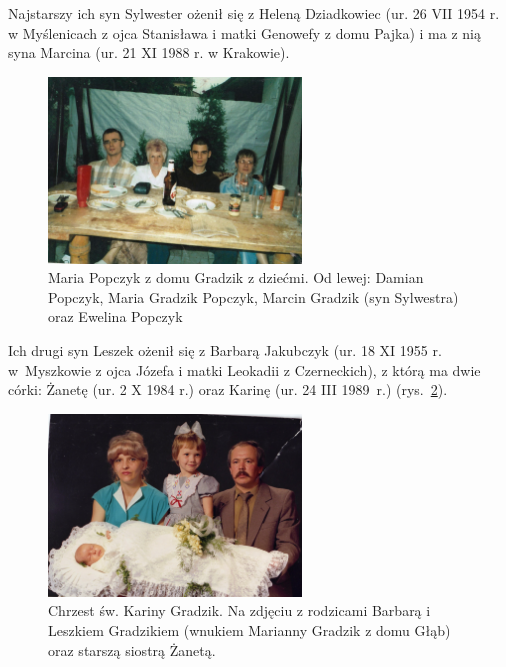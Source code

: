 Najstarszy ich syn Sylwester ożenił się z Heleną Dziadkowiec (ur. 26 VII 1954 r. w Myślenicach z ojca Stanisława i matki Genowefy z domu Pajka) i ma z nią syna Marcina (ur. 21 XI 1988 r. w Krakowie).

\begin{figure}[!h]
\begin{center}
\includegraphics[width=0.6\textwidth]{zdjecia/damian_maria_ewelina_popczykowie_marcin_gradzik.jpg}
\caption[Maria Popczyk z dziećmi]{Maria Popczyk z domu Gradzik z dziećmi. Od lewej: Damian Popczyk, Maria Gradzik Popczyk, Marcin Gradzik (syn Sylwestra) oraz Ewelina Popczyk}
\label{rys:damian_maria_ewelina_popczykowie_marcin_gradzik}
\end{center}
\end{figure}

Ich drugi syn Leszek ożenił się z Barbarą Jakubczyk (ur. 18 XI 1955 r. w~Myszkowie z ojca Józefa i matki Leokadii z Czerneckich), z którą ma dwie córki: Żanetę (ur. 2 X 1984 r.) oraz Karinę (ur. 24 III 1989~r.) (rys.~\ref{rys:leszek_barbara_karina_zaneta_gradzik}).

\begin{figure}[!h]
\begin{center}
\includegraphics[width=0.6\textwidth]{zdjecia/leszek_barbara_karina_zaneta_gradzik.jpg}
\caption[Chrzest św. Kariny Gradzik]{Chrzest św. Kariny Gradzik. Na zdjęciu z rodzicami Barbarą i Leszkiem Gradzikiem (wnukiem Marianny Gradzik z domu Głąb) oraz starszą siostrą Żanetą.}
\label{rys:leszek_barbara_karina_zaneta_gradzik}
\end{center}
\end{figure}

